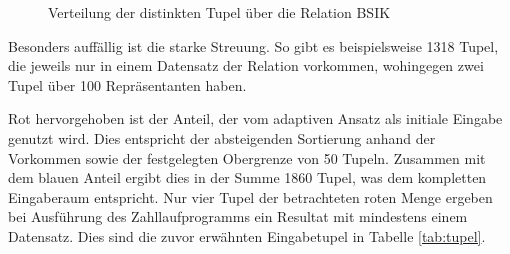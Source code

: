 \begin{figure}[h]
\centering
	\caption{Verteilung der distinkten Tupel über die Relation BSIK}
	\label{fig:combverteilung}
\end{figure}

Besonders auffällig ist die starke Streuung.
So gibt es beispielsweise 1318 Tupel, die jeweils nur in einem Datensatz der Relation vorkommen, wohingegen zwei Tupel über 100 Repräsentanten haben.

Rot hervorgehoben ist der Anteil, der vom adaptiven Ansatz als initiale Eingabe genutzt wird.
Dies entspricht der absteigenden Sortierung anhand der Vorkommen sowie der festgelegten Obergrenze von 50 Tupeln.
Zusammen mit dem blauen Anteil ergibt dies in der Summe 1860 Tupel, was dem kompletten Eingaberaum entspricht.
Nur vier Tupel der betrachteten roten Menge ergeben bei Ausführung des Zahllaufprogramms ein Resultat mit mindestens einem Datensatz.
Dies sind die zuvor erwähnten Eingabetupel in Tabelle \ref{tab:tupel}.

